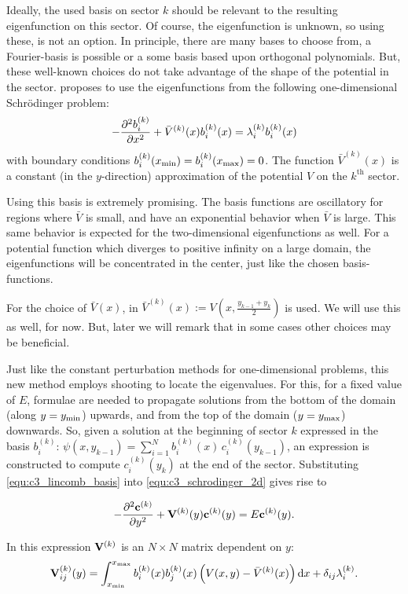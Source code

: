 Ideally, the used basis on sector $k$ should be relevant to the resulting eigenfunction on this sector. Of course, the eigenfunction is unknown, so using these, is not an option. In principle, there are many bases to choose from, a Fourier-basis is possible or a some basis based upon orthogonal polynomials. But, these well-known choices do not take advantage of the shape of the potential in the sector. \cite{ixaru_new_2010} proposes to use the eigenfunctions from the following one-dimensional Schrödinger problem:
$$
    -\pdv[2]{b_i^{(k)}}{x} + \bar{V}^{(k)}(x)b_i^{(k)}(x) = \lambda_i^{(k)} b_i^{(k)}(x)
$$
with boundary conditions $b_i^{(k)}({x_{\text{min}}}) = b_i^{(k)}({x_{\text{max}}}) = 0$. The function $\bar{V}^{(k)}(x)$ is a constant (in the $y$-direction) approximation of the potential $V$ on the $k^\text{th}$ sector.

Using this basis is extremely promising. The basis functions are oscillatory for regions where $\bar{V}$ is small, and have an exponential behavior when $\bar{V}$ is large. This same behavior is expected for the two-dimensional eigenfunctions as well. For a potential function which diverges to positive infinity on a large domain, the eigenfunctions will be concentrated in the center, just like the chosen basis-functions.

For the choice of $\bar{V}(x)$, in \cite{ixaru_new_2010} $\bar{V}^{(k)}(x) := V\left(x, \frac{y_{k-1} + y_k}{2}\right)$ is used. We will use this as well, for now. But, later we will remark that in some cases other choices may be beneficial.

Just like the constant perturbation methods for one-dimensional problems, this new method employs shooting to locate the eigenvalues. For this, for a fixed value of $E$, formulae are needed to propagate solutions from the bottom of the domain (along $y = {y_{\text{min}}}$) upwards, and from the top of the domain ($y = {y_{\text{max}}}$) downwards. So, given a solution at the beginning of sector $k$ expressed in the basis $b_i^{(k)}$: $ \psi(x, y_{k-1}) = \sum_{i=1}^{N} b_i^{(k)}(x)\, c_i^{(k)}(y_{k-1}) $, an expression is constructed to compute $c^{(k)}_i(y_k)$ at the end of the sector. Substituting \eqref{equ:c3_lincomb_basis} into \eqref{equ:c3_schrodinger_2d} gives rise to

\begin{equation}\label{equ:c3_coupled_system}
    -\pdv[2]{\vb{c}^{(k)}}{y} + \vb{V}^{(k)}(y) \vb{c}^{(k)}(y) = E \vb{c}^{(k)}(y) \text{.}
\end{equation}

In this expression $\vb{V}^{(k)}$ is an $N\times N$ matrix dependent on $y$:
\begin{equation}\label{equ:c3_v_matrix}
    \vb{V}^{(k)}_{ij}(y) = \int_{{x_{\text{min}}}}^{{x_{\text{max}}}} b_i^{(k)}(x) b_j^{(k)}(x) \left(V(x, y) - \bar{V}^{(k)}(x)\right) \dd x + \delta_{ij} \lambda_i^{(k)} \text{.}
\end{equation}


